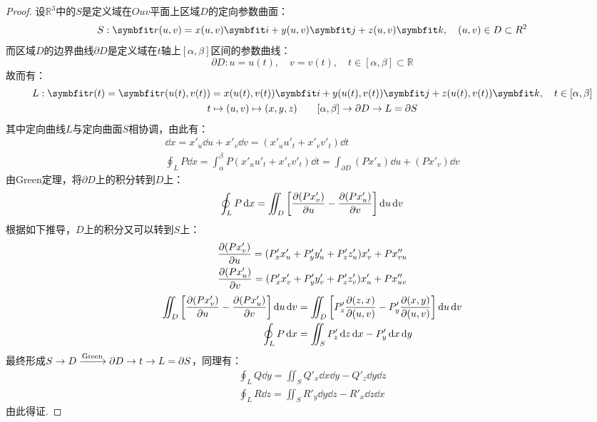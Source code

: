 \begin{proof}
    设$\mathbb{R}^3$中的$S$是定义域在$Ouv$平面上区域$D$的定向参数曲面：
    \[S:\vb{r}(u,v) = x(u,v)\vb{i} + y(u,v)\vb{j} + z(u,v)\vb{k},\quad (u,v)\in D \subset\mathbb{R}^2\]
    而区域$D$的边界曲线$\partial D$是定义域在$t$轴上$[\alpha,\beta]$区间的参数曲线：
    \[\partial D: u = u(t),\quad v = v(t),\quad t\in[\alpha,\beta]\subset\mathbb{R}\]
    故而有：
    \begin{gather*}
        L:\vb{r}(t) = \vb{r}(u(t),v(t)) = x(u(t),v(t))\vb{i} + y(u(t),v(t))\vb{j} + z(u(t),v(t))\vb{k},\quad t\in[\alpha,\beta]\\
        t\mapsto(u,v)\mapsto(x,y,z)\qquad [\alpha,\beta]\to \partial D \to L = \partial S
    \end{gather*}
    其中定向曲线$L$与定向曲面$S$相协调，由此有：
    \begin{gather*}
        \dd{x} = x'_u\dd{u} + x'_v\dd{v} = (x'_u u'_t + x'_v v'_t)\dd{t} \\
        \oint_L P\dd{x} = \int_{\alpha}^{\beta}P(x'_u u'_t + x'_v v'_t)\dd{t} = \int_{\partial D}(Px'_u)\dd{u} + (Px'_v)\dd{v}
    \end{gather*}
    由Green定理，将$\partial D$上的积分转到$D$上：
    \[\oint_L P\dd{x} = \iint_D\left[\pdv{(Px'_v)}{u} - \pdv{(Px'_u)}{v}\right]\dd{u}\dd{v}\]
    根据如下推导，$D$上的积分又可以转到$S$上：
    \begin{gather*}
        \pdv{(Px'_v)}{u} = (P'_x x'_u + P'_y y'_u + P'_z z'_u)x'_v + P x''_{vu} \\
        \pdv{(Px'_u)}{v} = (P'_x x'_v + P'_y y'_v + P'_z z'_v)x'_u + P x''_{uv}
    \end{gather*}
    \begin{align*}
        \iint_D\left[\pdv{(Px'_v)}{u} - \pdv{(Px'_u)}{v}\right]\dd{u}\dd{v} &= \iint_D\left[P'_z\pdv{(z,x)}{(u,v)} - P'_y\pdv{(x,y)}{(u,v)}\right]\dd{u}\dd{v} \\
        \oint_L P\dd{x} &= \iint_S P'_z\dd{z}\dd{x} - P'_y\dd{x}\dd{y}
    \end{align*}
    最终形成$S \to D \xlongrightarrow{\text{Green}} \partial D \to t \to L = \partial S$，同理有：
    \begin{gather*}
        \oint_L Q\dd{y} = \iint_S Q'_x\dd{x}\dd{y} - Q'_z\dd{y}\dd{z} \\
        \oint_L R\dd{z} = \iint_S R'_y\dd{y}\dd{z} - R'_x\dd{z}\dd{x}
    \end{gather*}
    由此得证.
\end{proof}

